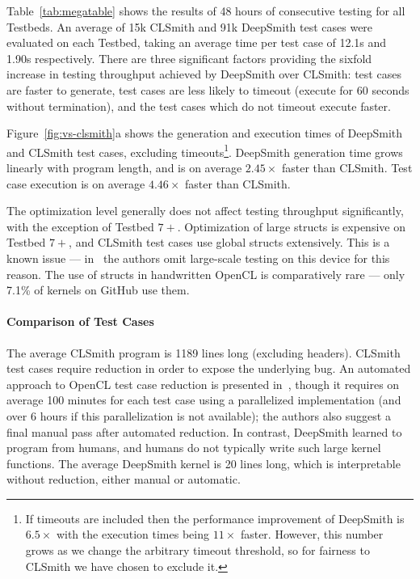 Table~\ref{tab:megatable} shows the results of 48 hours of consecutive testing for all Testbeds. An average of 15k CLSmith and 91k DeepSmith test cases were evaluated on each Testbed, taking an average time per test case of 12.1s and 1.90s respectively. There are three significant factors providing the sixfold increase in testing throughput achieved by DeepSmith over CLSmith: test cases are faster to generate, test cases are less likely to timeout (execute for 60 seconds without termination), and the test cases which do not timeout execute faster.

Figure~\ref{fig:vs-clsmith}a shows the generation and execution times of DeepSmith and CLSmith test cases, excluding timeouts\footnote{If timeouts are included then the performance improvement of DeepSmith is $6.5\times$ with the execution times being $11\times$ faster. However, this number grows as we change the arbitrary timeout threshold, so for fairness to CLSmith we have chosen to exclude it.}. DeepSmith generation time grows linearly with program length, and is on average $2.45\times$ faster than CLSmith. Test case execution is on average $4.46\times$ faster than CLSmith.

The optimization level generally does not affect testing throughput significantly, with the exception of Testbed $7+$. Optimization of large structs is expensive on Testbed $7+$, and CLSmith test cases use global structs extensively. This is a known issue --- in~\cite{Lidbury2015a} the authors omit large-scale testing on this device for this reason. The use of structs in handwritten OpenCL is comparatively rare --- only 7.1\% of kernels on GitHub use them.


\paragraph{Comparison of Test Cases} %
The average CLSmith program is 1189 lines long (excluding headers). CLSmith test cases require reduction in order to expose the underlying bug. An automated approach to OpenCL test case reduction is presented in~\cite{Pflanzer2016}, though it requires on average 100 minutes for each test case using a parallelized implementation (and over 6 hours if this parallelization is not available); the authors also suggest a final manual pass after automated reduction. In contrast, DeepSmith learned to program from humans, and humans do not typically write such large kernel functions. The average DeepSmith kernel is 20 lines long, which is interpretable without reduction, either manual or automatic.

